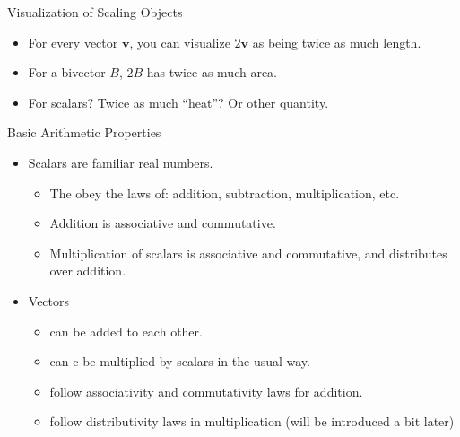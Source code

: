 \documentclass[aspectratio=169,xcolor=dvipsnames]{beamer}
\begin{document}

\begin{frame}{Visualization of Scaling Objects}
\begin{itemize}
\item For every vector $\mathbf v$, you can visualize $2\mathbf v$ as being twice as
      much length. 
\item For a bivector $B$, $2B$ has twice as much area. 
\item For scalars? Twice as much ``heat''? Or other quantity.
\end{itemize}

\end{frame}


\begin{frame}{Basic Arithmetic Properties}
\begin{itemize}
\item Scalars are familiar real numbers. 
      \begin{itemize}
            \item The obey the laws of: addition, subtraction, multiplication, etc.
            \item Addition is associative and commutative.
            \item Multiplication of scalars is associative and commutative, and distributes over
                  addition.
      \end{itemize}
\item Vectors
      \begin{itemize}
            \item can be added to each other.
            \item can c be multiplied by scalars in the usual way.
            \item follow associativity and commutativity laws for addition.
            \item follow distributivity laws in multiplication (will be introduced a bit later)
      \end{itemize}
\end{itemize}

\end{frame}
      
\end{document}
